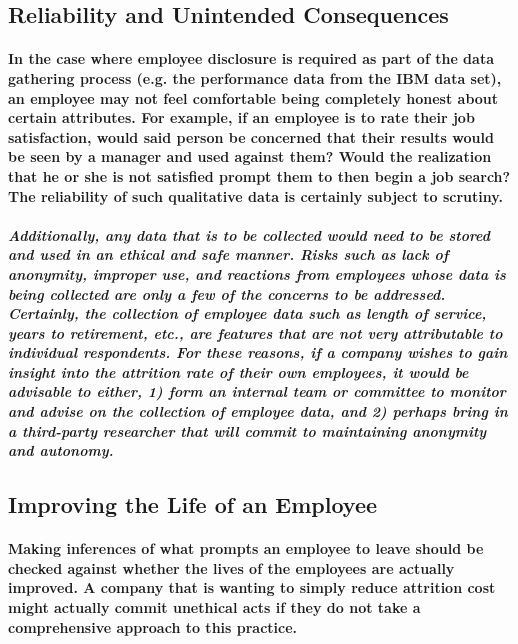 \documentclass[10pt]{article}
\begin{document}
\subsection{Reliability and Unintended Consequences}

\paragraph{In the case where employee disclosure is required as part of the data gathering process (e.g. the performance data from the IBM data set), an employee may not feel comfortable being completely honest about certain attributes. For example, if an employee is to rate their job satisfaction, would said person be concerned that their results would be seen by a manager and used against them? Would the realization that he or she is not satisfied prompt them to then begin a job search? The reliability of such qualitative data is certainly subject to scrutiny.}
 
\subparagraph{Additionally, any data that is to be collected would need to be stored and used in an ethical and safe manner.  Risks such as lack of anonymity, improper use, and reactions from employees whose data is being collected are only a few of the concerns to be addressed. Certainly, the collection of employee data such as length of service, years to retirement, etc., are features that are not very attributable to individual respondents. For these reasons, if a company wishes to gain insight into the attrition rate of their own employees, it would be advisable to either, 1) form an internal team or committee to monitor and advise on the collection of employee data, and 2) perhaps bring in a third-party researcher that will commit to maintaining anonymity and autonomy.}
 
\subsection{Improving the Life of an Employee}

\paragraph{Making inferences of what prompts an employee to leave should be checked against whether the lives of the employees are actually improved. A company that is wanting to simply reduce attrition cost might actually commit unethical acts if they do not take a comprehensive approach to this practice.}
\end{document}
